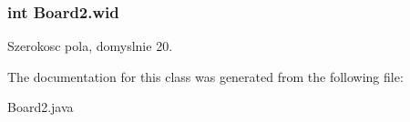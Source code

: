 \hypertarget{classBoard2_a7873fa80bb562ba0ce7c93f76eddc8f3}{
\subsubsection[{wid}]{\setlength{\rightskip}{0pt plus 5cm}int Board2.\-wid\hspace{0.3cm}{\ttfamily [package]}}}\label{classBoard2_a7873fa80bb562ba0ce7c93f76eddc8f3}


Szerokosc pola, domyslnie 20. 



The documentation for this class was generated from the following file\-:\begin{DoxyCompactItemize}
\item 
Board2.\-java\end{DoxyCompactItemize}
